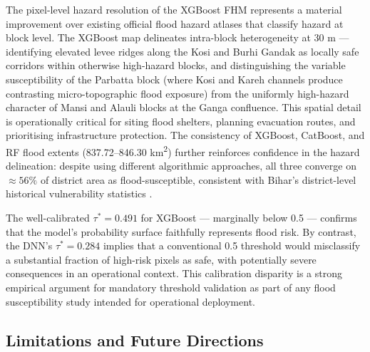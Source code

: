 \documentclass[12pt, a4paper]{article}
\begin{document}
The pixel-level hazard resolution of the XGBoost FHM represents a material improvement over existing official flood hazard atlases \citep{bhuvan2010} that classify hazard at block level. The XGBoost map delineates intra-block heterogeneity at 30 m --- identifying elevated levee ridges along the Kosi and Burhi Gandak as locally safe corridors within otherwise high-hazard blocks, and distinguishing the variable susceptibility of the Parbatta block (where Kosi and Kareh channels produce contrasting micro-topographic flood exposure) from the uniformly high-hazard character of Mansi and Alauli blocks at the Ganga confluence. This spatial detail is operationally critical for siting flood shelters, planning evacuation routes, and prioritising infrastructure protection. The consistency of XGBoost, CatBoost, and RF flood extents (837.72--846.30 km\textsuperscript{2}) further reinforces confidence in the hazard delineation: despite using different algorithmic approaches, all three converge on $\approx 56\%$ of district area as flood-susceptible, consistent with Bihar's district-level historical vulnerability statistics \citep{beams2024}.

The well-calibrated $\tau^* = 0.491$ for XGBoost --- marginally below 0.5 --- confirms that the model's probability surface faithfully represents flood risk. By contrast, the DNN's $\tau^* = 0.284$ implies that a conventional 0.5 threshold would misclassify a substantial fraction of high-risk pixels as safe, with potentially severe consequences in an operational context. This calibration disparity is a strong empirical argument for mandatory threshold validation as part of any flood susceptibility study intended for operational deployment.

\subsection{Limitations and Future Directions}
\end{document}
